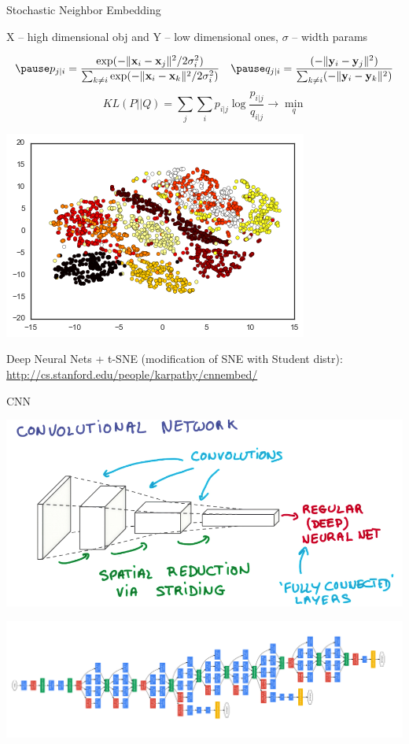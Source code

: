 \documentclass{beamer}
\begin{document}
\begin{frame}{Stochastic Neighbor Embedding}
	
	\pause  X -- high dimensional obj and Y -- low dimensional ones, $\sigma$ -- width params
	
	$$\pause p_{j\mid i} = \frac{\exp(-\lVert\mathbf{x}_i - \mathbf{x}_j\rVert^2 / 2\sigma_i^2)}{\sum_{k \neq i} \exp(-\lVert\mathbf{x}_i - \mathbf{x}_k\rVert^2 / 2\sigma_i^2)}~~~\pause q_{j|i} = \frac{(-\lVert \mathbf{y}_i - \mathbf{y}_j\rVert^2)}{\sum_{k \neq i} (-\lVert \mathbf{y}_i - \mathbf{y}_k\rVert^2)}$$
	\pause 
	\vspace{-0.1cm}
	$$KL(P||Q) = \sum_j\sum_{i} p_{i|j} \log \frac{p_{i|j}}{q_{i|j}} \rightarrow \min_q$$
	
	 \begin{center}
		 	\pause \includegraphics[scale=0.4]{img/tsne_mnist}
	 \end{center}
	\pause
	Deep Neural Nets + t-SNE (modification of SNE with Student distr): \href{http://cs.stanford.edu/people/karpathy/cnnembed/}{http://cs.stanford.edu/people/karpathy/cnnembed/}
\end{frame}

\begin{frame}{CNN}
	 \begin{center}
	 	\pause
	 	\includegraphics[scale=0.25]{img/cnn}
	 	
	 	\pause
	 	\includegraphics[scale=0.4]{img/gn}
	 \end{center}
\end{frame}
\end{document}
